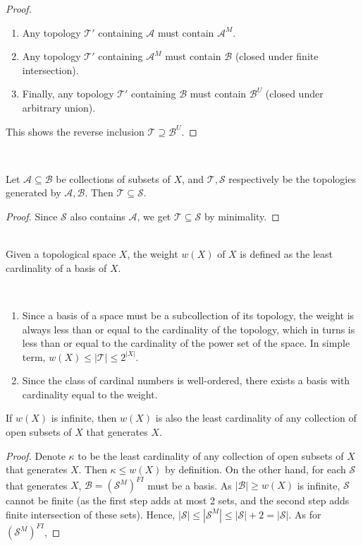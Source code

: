 \documentclass{treatise}
\begin{document}
\begin{shaded}
\begin{proof}
\begin{enumerate}
    \item Any topology $\mathcal{T}'$ containing $\mathcal{A}$ must contain $\mathcal{A}^M$.
    \item Any topology $\mathcal{T}'$ containing $\mathcal{A}^M$ must contain $\mathcal{B}$ (closed under finite intersection).
    \item Finally, any topology $\mathcal{T}'$ containing $\mathcal{B}$ must contain $\mathcal{B}^U$ (closed under arbitrary union).
\end{enumerate}
This shows the reverse inclusion $\mathcal{T} \supseteq \mathcal{B}^U$.
\end{proof}
\ \\
\begin{lemma}\label{topo-compare-generation}
Let $\mathcal{A} \subseteq \mathcal{B}$ be collections of subsets of $X$, and $\mathcal{T}, \mathcal{S}$ respectively be the topologies generated by $\mathcal{A}, \mathcal{B}$. Then $\mathcal{T} \subseteq \mathcal{S}$.
\end{lemma}
\begin{proof}
Since $\mathcal{S}$ also contains $\mathcal{A}$, we get $\mathcal{T} \subseteq \mathcal{S}$ by minimality.
\end{proof}
\ \\
Given a topological space $X$, the weight $w(X)$ of $X$ is defined as the least cardinality of a basis of $X$.
\begin{remark} \ 
\begin{enumerate}
    \item Since a basis of a space must be a subcollection of its topology, the weight is always less than or equal to the cardinality of the topology, which in turns is less than or equal to the cardinality of the power set of the space. In simple term, $w(X) \leq |\mathcal{T}| \leq 2^{|X|}$.
    \item Since the class of cardinal numbers is well-ordered, there exists a basis with cardinality equal to the weight.
\end{enumerate}
\end{remark}
\begin{lemma}
If $w(X)$ is infinite, then $w(X)$ is also the least cardinality of any collection of open subsets of $X$ that generates $X$.
\end{lemma}
\begin{proof}
Denote $\kappa$ to be the least cardinality of any collection of open subsets of $X$ that generates $X$. Then $\kappa \leq w(X)$ by definition. On the other hand, for each $\mathcal{S}$ that generates $X$, $\mathcal{B} = (\mathcal{S}^{M})^{FI}$ must be a basis. As $|\mathcal{B}| \geq w(X)$ is infinite, $\mathcal{S}$ cannot be finite (as the first step adds at most 2 sets, and the second step adds finite intersection of these sets). Hence, $|\mathcal{S}| \leq |\mathcal{S}^M| \leq |\mathcal{S}| + 2 = |\mathcal{S}|$. As for $(\mathcal{S}^{M})^{FI}$,

\end{proof}
\end{shaded}
\end{document}
